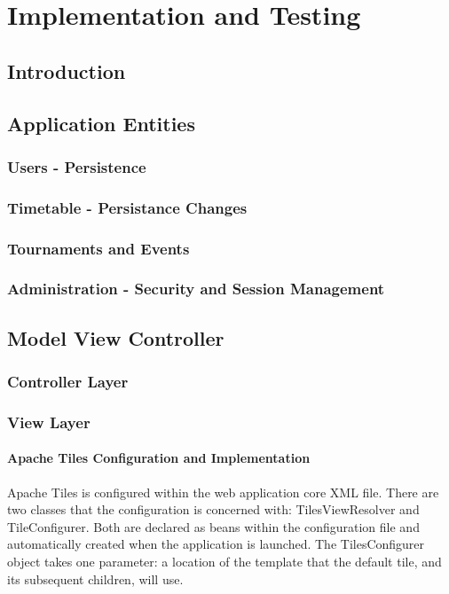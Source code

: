 \chapter{Implementation and Testing}
\label{impltesting}

\section{Introduction}

\section{Application Entities}
\subsection{Users - Persistence}
\subsection{Timetable - Persistance Changes}
\subsection{Tournaments and Events}
\subsection{Administration - Security and Session Management}

\section{Model View Controller}
\subsection{Controller Layer}
\subsection{View Layer}
\subsubsection{Apache Tiles Configuration and Implementation}

Apache Tiles is configured within the web application core XML file. There are two classes that the configuration is concerned with: TilesViewResolver and TileConfigurer. Both are declared as beans within the configuration file and automatically created when the application is launched. The TilesConfigurer object takes one parameter: a location of the template that the default tile, and its subsequent children, will use. \newline

